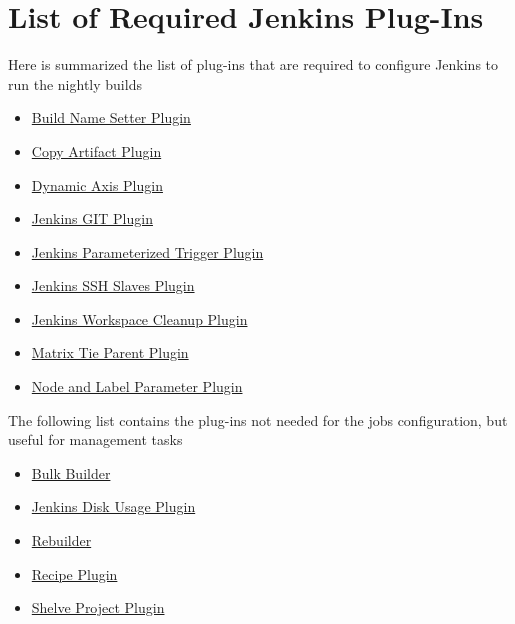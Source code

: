 \documentclass{lhcbnote}
\newcommand{\link}[2]{\href{#1}{#2}}
\begin{document}
\section{List of Required Jenkins Plug-Ins}
\label{JenkinsPlugIns}
Here is summarized the list of plug-ins that are required to configure Jenkins
to run the nightly builds
\newcommand{\JPI}[2]{\item \link{#2}{#1}}
\begin{itemize}
  \JPI{Build Name Setter
Plugin}{http://wiki.jenkins-ci.org/display/JENKINS/Build+Name+Setter+Plugin}
  \JPI{Copy Artifact
Plugin}{http://wiki.jenkins-ci.org/display/JENKINS/Copy+Artifact+Plugin}
  \JPI{Dynamic Axis
Plugin}{https://wiki.jenkins-ci.org/display/JENKINS/DynamicAxis+Plugin}
  \JPI{Jenkins GIT
Plugin}{http://wiki.jenkins-ci.org/display/JENKINS/Git+Plugin}
  \JPI{Jenkins Parameterized Trigger
Plugin}{http://wiki.jenkins-ci.org/display/JENKINS/Parameterized+Trigger+Plugin}
  \JPI{Jenkins SSH Slaves
Plugin}{http://wiki.jenkins-ci.org/display/JENKINS/SSH+Slaves+plugin}
  \JPI{Jenkins Workspace Cleanup
Plugin}{http://wiki.jenkins-ci.org/display/JENKINS/Workspace+Cleanup+Plugin}
  \JPI{Matrix Tie Parent
Plugin}{http://wiki.hudson-ci.org/display/HUDSON/Matrix+Tie+Parent+Plugin}
  \JPI{Node and Label Parameter
Plugin}{https://wiki.jenkins-ci.org/display/JENKINS/NodeLabel+Parameter+Plugin}
\end{itemize}

The following list contains the plug-ins not needed for the jobs configuration,
but useful for management tasks
\begin{itemize}
  \JPI{Bulk
Builder}{http://wiki.jenkins-ci.org/display/JENKINS/Bulk+Builder+Plugin}
  \JPI{Jenkins Disk Usage
Plugin}{http://wiki.jenkins-ci.org/display/JENKINS/Disk+Usage+Plugin}
  \JPI{Rebuilder}{http://wiki.jenkins-ci.org/display/JENKINS/Rebuild+Plugin}
  \JPI{Recipe Plugin}{https://wiki.jenkins-ci.org/display/JENKINS/Recipe+Plugin}
  \JPI{Shelve Project
Plugin}{http://wiki.jenkins-ci.org/display/JENKINS/Shelve+Project+Plugin}
\end{itemize}
\end{document}
